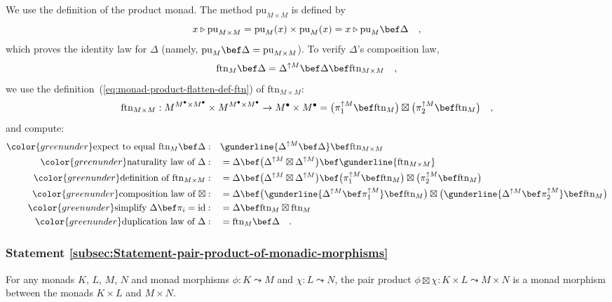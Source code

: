 We use the definition of the product monad. The method $\text{pu}_{M\times M}$
is defined by
\[
x\triangleright\text{pu}_{M\times M}=\text{pu}_{M}(x)\times\text{pu}_{M}(x)=x\triangleright\text{pu}_{M}\bef\Delta\quad,
\]
which proves the identity law for $\Delta$ (namely, $\text{pu}_{M}\bef\Delta=\text{pu}_{M\times M}$).
To verify $\Delta$\textsf{'}s composition law, 
\[
\text{ftn}_{M}\bef\Delta=\Delta^{\uparrow M}\bef\Delta\bef\text{ftn}_{M\times M}\quad,
\]
we use the definition~(\ref{eq:monad-product-flatten-def-ftn}) of
$\text{ftn}_{M\times M}$:
\[
\text{ftn}_{M\times M}:M^{M^{\bullet}\times M^{\bullet}}\times M^{M^{\bullet}\times M^{\bullet}}\rightarrow M^{\bullet}\times M^{\bullet}=\big(\pi_{1}^{\uparrow M}\bef\text{ftn}_{M}\big)\boxtimes\big(\pi_{2}^{\uparrow M}\bef\text{ftn}_{M}\big)\quad,
\]
and compute:
\begin{align*}
{\color{greenunder}\text{expect to equal }\text{ftn}_{M}\bef\Delta:}\quad & \gunderline{\Delta^{\uparrow M}\bef\Delta}\bef\text{ftn}_{M\times M}\\
{\color{greenunder}\text{naturality law of }\Delta:}\quad & =\Delta\bef\big(\Delta^{\uparrow M}\boxtimes\Delta^{\uparrow M}\big)\bef\gunderline{\text{ftn}_{M\times M}}\\
{\color{greenunder}\text{definition of }\text{ftn}_{M\times M}:}\quad & =\Delta\bef\big(\Delta^{\uparrow M}\boxtimes\Delta^{\uparrow M}\big)\bef\big(\pi_{1}^{\uparrow M}\bef\text{ftn}_{M}\big)\boxtimes\big(\pi_{2}^{\uparrow M}\bef\text{ftn}_{M}\big)\\
{\color{greenunder}\text{composition law of }\boxtimes:}\quad & =\Delta\bef\big(\gunderline{\Delta^{\uparrow M}\bef\pi_{1}^{\uparrow M}}\bef\text{ftn}_{M}\big)\boxtimes\big(\gunderline{\Delta^{\uparrow M}\bef\pi_{2}^{\uparrow M}}\bef\text{ftn}_{M}\big)\\
{\color{greenunder}\text{simplify }\Delta\bef\pi_{i}=\text{id}:}\quad & =\Delta\bef\text{ftn}_{M}\boxtimes\text{ftn}_{M}\\
{\color{greenunder}\text{duplication law of }\Delta:}\quad & =\text{ftn}_{M}\bef\Delta\quad.
\end{align*}


\subsubsection{Statement \label{subsec:Statement-pair-product-of-monadic-morphisms}\ref{subsec:Statement-pair-product-of-monadic-morphisms}}

For any monads $K$, $L$, $M$, $N$ and monad morphisms $\phi:K\leadsto M$
and $\chi:L\leadsto N$, the pair product $\phi\boxtimes\chi:K\times L\leadsto M\times N$
is a monad morphism between the monads $K\times L$ and $M\times N$.

